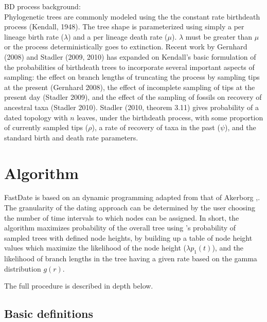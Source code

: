 \documentclass{llncs}
\begin{document}
BD process background:\\
Phylogenetic trees are commonly modeled using the the constant rate birth\textendash death process (Kendall,
1948).
The tree shape is parameterized using simply a per lineage birth rate ($\lambda$) and a per lineage death rate ($\mu$).
$\lambda$ must be greater than $\mu$ or the process deterministically goes to extinction.
Recent work by Gernhard (2008) and Stadler (2009, 2010) has expanded on Kendall's basic 
formulation of the probabilities of birth\textendash death trees to incorporate several important aspects of sampling:
the effect on branch lengths of truncating the process by sampling tips at the present (Gernhard 2008),
the effect of incomplete sampling of tips at the present day (Stadler 2009), and the effect of the sampling
of fossils on recovery of ancestral taxa (Stadler 2010).
Stadler (2010, theorem 3.11) gives probability of a dated topology with $n$ leaves,
under the birth\textendash death process, with some proportion of currently sampled tips ($\rho$), a rate of recovery of taxa in the past ($\psi$),
and the standard birth and death rate parameters.


\section{Algorithm}
FastDate is based on an dynamic programming adapted from that of Akerborg \cite{Akerborg2008},.
The granularity of the dating approach can be determined by the user choosing the number of time intervals to which 
nodes can be assigned.
In short, the algorithm maximizes probability of the overall tree using \cite{Stadler2010} 's probability of sampled trees with defined node heights,
by building up a table of node height values which maximize the likelihood of the node height ($\lambda p_1(t)$), 
and the likelihood of branch lengths in the tree having a given rate based on the gamma distribution $g(r)$.

The full procedure is described in depth below.


\subsection{Basic definitions}
\end{document}
